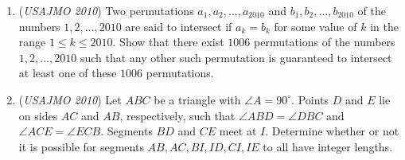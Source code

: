 \begin{enumerate}
 

	\item (\textit{USAJMO 2010}) Two permutations $a_1, a_2, \ldots, a_{2010}$ and $b_1, b_2, \ldots, b_{2010}$ of the numbers $1, 2, \ldots, 2010$ are said to intersect if $a_k = b_k$ for some value of $k$ in the range $1\leq k\leq 2010$. Show that there exist $1006$ permutations
of the numbers $1, 2, \ldots, 2010$ such that any other such permutation is guaranteed to intersect at least one of these $1006$ permutations.


 

	\item (\textit{USAJMO 2010}) Let $ABC$ be a triangle with $\angle A = 90^{\circ}$. Points $D$ and $E$ lie on sides $AC$ and $AB$, respectively, such that $\angle ABD = \angle DBC$ and $\angle ACE = \angle ECB$. Segments $BD$ and $CE$ meet at $I$.  Determine whether or not it is possible for segments $AB, AC, BI, ID, CI, IE$ to all have integer lengths.


 

\end{enumerate}